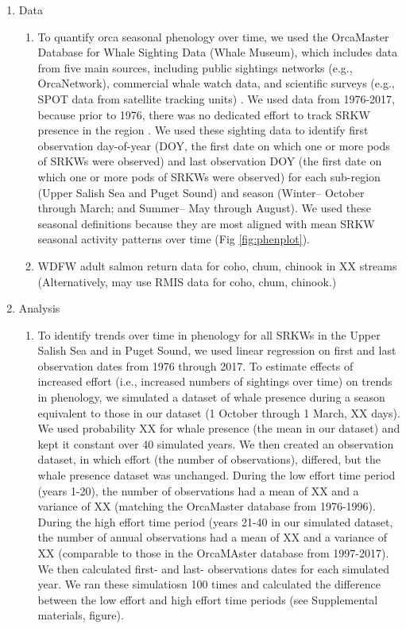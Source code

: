 \documentclass{article}
\begin{document}
\begin{enumerate}
\item Data
\begin{enumerate}
\item To quantify orca seasonal phenology over time, we used the OrcaMaster Database for Whale Sighting Data (Whale Museum), which includes data from five main sources, including public sightings networks (e.g., OrcaNetwork), commercial whale watch data, and scientific surveys (e.g., SPOT data from satellite tracking units) \citep{olson2018}. We used data from 1976-2017, because prior to 1976, there was no dedicated effort to track SRKW presence in the region \citep{olson2018}. We used these sighting data to identify first observation day-of-year (DOY, the first date on which one or more pods of SRKWs were observed) and last observation DOY (the first date on which one or more pods of SRKWs were observed) for each sub-region (Upper Salish Sea and Puget Sound) and season (Winter-- October through March; and Summer-- May through August). We used these seasonal definitions because they are most aligned with mean SRKW seasonal activity patterns over time (Fig \ref{fig:phenplot}).
\item WDFW adult salmon return data for coho, chum, chinook in XX streams (Alternatively, may use RMIS data for coho, chum, chinook.)
\end{enumerate}
\item Analysis
\begin{enumerate}
\item To identify trends over time in phenology for all SRKWs in the Upper Salish Sea and in Puget Sound, we used linear regression on first  and last observation dates from 1976 through 2017. To estimate effects of increased effort (i.e., increased numbers of sightings over time) on trends in phenology, we simulated a dataset of whale presence during a season equivalent to those in our dataset (1 October through 1 March, XX days). We used probability XX for whale presence (the mean in our dataset) and kept it constant over 40 simulated years. We then created an observation dataset, in which effort (the number of observations), differed, but the whale presence dataset was unchanged. During the low effort time period (years 1-20), the number of observations had a mean of XX and a variance of XX (matching the OrcaMaster database from 1976-1996).  During the high effort time period (years 21-40 in our simulated dataset, the number of annual observations had a mean of XX and a variance of XX (comparable to those in the OrcaMAster database from 1997-2017). We then calculated first- and last- observations dates for each simulated year. We ran these simulatiosn 100 times and calculated the difference between the low effort and high effort time periods (see Supplemental materials, figure).


\end{enumerate}
\end{enumerate}
\end{document}
